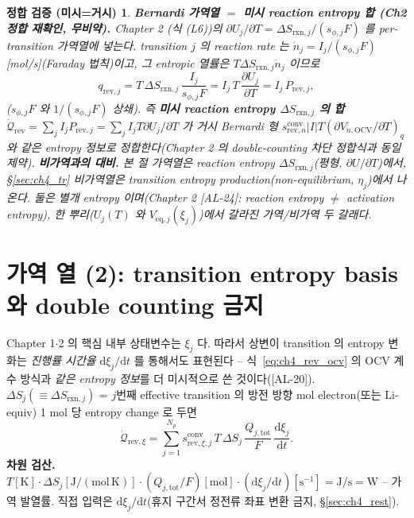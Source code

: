 \documentclass[11pt,a4paper]{article}
\newtheorem*{verifybox}{정합 검증 (미시=거시)}
\newcommand{\dd}{\mathrm{d}}
\newcommand{\eq}{\mathrm{eq}}
\newcommand{\OCV}{\mathrm{OCV}}
\newcommand{\tot}{\mathrm{tot}}
\newcommand{\rev}{\mathrm{rev}}
\newcommand{\rxn}{\mathrm{rxn}}
\newcommand{\conv}{\mathrm{conv}}
\newcommand{\AL}[1]{\textsf{[AL-#1]}}
\begin{document}
\begin{verifybox}
\textbf{Bernardi 가역열 $=$ 미시 reaction entropy 합 (Ch2 정합 재확인, 무비약).} Chapter 2 (식 (L6))의
$\partial U_j/\partial T=\Delta S_{\rxn,j}/(s_{\phi,j}F)$ 를 per-transition 가역열에 넣는다. transition $j$ 의
reaction rate 는 $\dot n_j=I_j/(s_{\phi,j}F)$ [mol/s](Faraday 법칙)이고, 그 entropic 열률은 $T\Delta S_{\rxn,j}\dot n_j$
이므로
\begin{equation}
q_{\rev,j}=T\,\Delta S_{\rxn,j}\,\frac{I_j}{s_{\phi,j}F}
=I_j\,T\,\frac{\partial U_j}{\partial T}=I_j\,P_{\rev,j},
\label{eq:ch4_qrev_micro}
\end{equation}
($s_{\phi,j}F$ 와 $1/(s_{\phi,j}F)$ 상쇄). 즉 \textbf{미시 reaction entropy $\Delta S_{\rxn,j}$ 의 합}
$\dot{\mathcal Q}_{\rev}=\sum_j I_jP_{\rev,j}=\sum_j I_j T\partial U_j/\partial T$ 가 거시 Bernardi 형
$s_{\rev,n}^{\conv}|I|T(\partial V_{n,\OCV}/\partial T)_q$ 와 같은 entropy 정보로 정합한다(Chapter 2 의
double-counting 차단 정합식과 동일 제약). \textbf{비가역과의 대비.} 본 절 가역열은 \emph{reaction} entropy
$\Delta S_{\rxn,j}$(평형, $\partial U/\partial T$)에서, \S\ref{sec:ch4_tr} 비가역열은 transition entropy
production(non-equilibrium, $\eta_j$)에서 나온다. 둘은 별개 entropy 이며(Chapter 2 \AL{24}: reaction entropy
$\ne$ activation entropy), 한 뿌리($U_j(T)$ 와 $V_{\eq,j}(\xi_j)$)에서 갈라진 가역/비가역 두 갈래다.
\end{verifybox}

\section{가역 열 (2): transition entropy basis 와 double counting 금지}\label{sec:ch4_revxi}
Chapter 1$\cdot$2 의 핵심 내부 상태변수는 $\xi_j$ 다. 따라서 상변이 transition 의 entropy 변화는 \emph{진행률
시간율} $\dd\xi_j/\dd t$ 를 통해서도 표현된다 -- 식~\eqref{eq:ch4_rev_ocv} 의 OCV 계수 방식과 \emph{같은 entropy
정보}를 더 미시적으로 쓴 것이다(\AL{20}). $\Delta S_j(\equiv\Delta S_{\rxn,j})$ = $j$번째 effective transition
의 방전 방향 mol electron(또는 Li-equiv) 1 mol 당 entropy change 로 두면
\begin{equation}
\dot{\mathcal Q}_{\rev,\xi}=\sum_{j=1}^{N_p}s_{\rev,\xi,j}^{\conv}\,T\,\Delta S_j\,\frac{Q_{j,\tot}}{F}\,\frac{\dd\xi_j}{\dd t}.
\label{eq:ch4_rev_xi}
\end{equation}
\textbf{차원 검산.} $T[\mathrm K]\cdot\Delta S_j[\mathrm{J/(mol\,K)}]\cdot(Q_{j,\tot}/F)[\mathrm{mol}]\cdot
(\dd\xi_j/\dd t)[\mathrm{s^{-1}}]=\mathrm{J/s}=\mathrm W$ -- 가역 발열률. 직접 입력은 $\dd\xi_j/\dd t$(휴지 구간서
정전류 좌표 변환 금지, \S\ref{sec:ch4_rest}).
\end{document}
